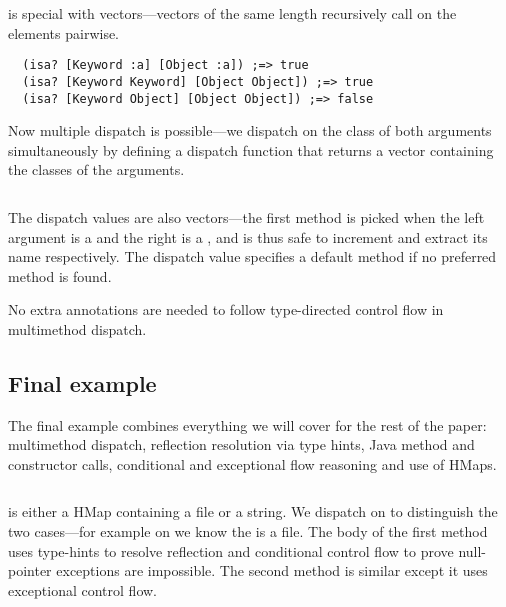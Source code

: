  is special with vectors---vectors of the
same length recursively call  on the elements pairwise.
\begin{verbatim}
  (isa? [Keyword :a] [Object :a]) ;=> true
  (isa? [Keyword Keyword] [Object Object]) ;=> true
  (isa? [Keyword Object] [Object Object]) ;=> false
\end{verbatim}

Now multiple dispatch is possible---we dispatch on the class of both
arguments simultaneously by defining a dispatch function that returns
a vector containing the classes of the arguments.
\begin{Code}
\begin{exmp}
\inputminted[firstline=6,lastline=23]{clojure}{code/demo/src/demo/eg7.clj}
\end{exmp}
\end{Code}
The dispatch values are also vectors---the first method is picked
when the left argument is a  and the right is a ,
and is thus safe to increment and extract its name respectively.
The dispatch value  specifies a default
method if no preferred method is found.

No extra annotations are needed to follow type-directed control flow
in multimethod dispatch.

\subsection{Final example}

The final example combines everything we will cover for the rest of the paper:
multimethod dispatch, reflection resolution via type hints, Java method
and constructor calls, conditional and exceptional flow reasoning
and use of HMaps. 
\begin{Code}
\begin{exmp}
\inputminted[firstline=6,lastline=20]{clojure}{code/demo/src/demo/eg8.clj}
\end{exmp}
\end{Code}
 is either a HMap containing a file
or a string. We dispatch on  to distinguish the two cases---for example on 
we know the  is a file.
The body of the first method uses type-hints to resolve reflection
and conditional control flow to prove null-pointer exceptions are impossible.
The second method is similar except it uses exceptional control flow.





